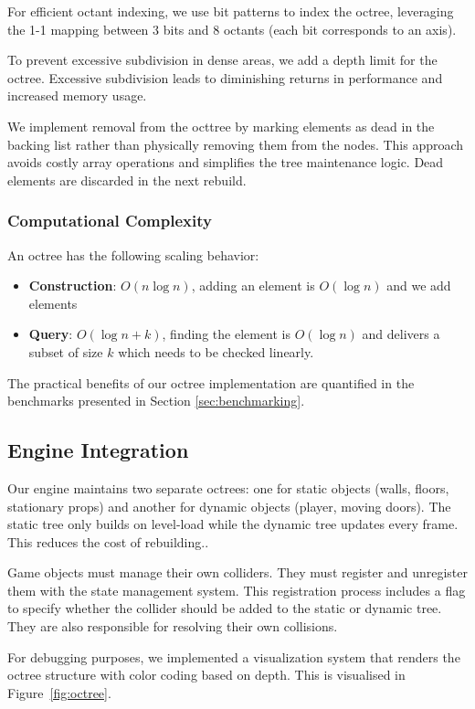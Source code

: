 \documentclass{article}
\begin{document}
For efficient octant indexing, we use bit patterns to index the octree,
leveraging the 1-1 mapping between 3 bits and 8 octants (each bit corresponds
to an axis).

To prevent excessive subdivision in dense areas, we add a depth limit for the
octree. Excessive subdivision leads to diminishing returns in performance and
increased memory usage.

We implement removal from the octtree by marking elements as dead in the
backing list rather than physically removing them from the nodes. This approach
avoids costly array operations and simplifies the tree maintenance logic. Dead
elements are discarded in the next rebuild.

\subsubsection{Computational Complexity}
An octree has the following scaling behavior:
\begin{itemize}
	\item \textbf{Construction}: $O(n \log n)$, adding an element is
		$O(\log n)$ and we add  elements

	\item \textbf{Query}: $O(\log n + k)$, finding the element is $O(\log n)$
		and delivers a subset of size $k$ which needs to be checked linearly.
\end{itemize}

The practical benefits of our octree implementation are quantified in the
benchmarks presented in Section \ref{sec:benchmarking}.

\subsection{Engine Integration}
Our engine maintains two separate octrees: one for static objects (walls,
floors, stationary props) and another for dynamic objects (player, moving
doors). The static tree only builds on level-load while the dynamic tree
updates every frame. This reduces the cost of rebuilding..

Game objects must manage their own colliders. They must register
and unregister them with the state management system. This registration process
includes a flag to specify whether the collider should be added to the static
or dynamic tree. They are also responsible for resolving their own collisions.

For debugging purposes, we implemented a visualization system that renders the
octree structure with color coding based on depth.  This is visualised in
Figure~\ref{fig:octree}.
\end{document}

